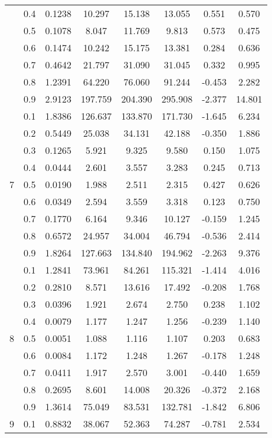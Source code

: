 \documentclass[11pt,a4paper]{report}
\begin{document}
\begin{longtable}{ | c | c || c | c | c | c | c | c | }
 & 0.4 & 0.1238 & 10.297 & 15.138 & 13.055 & 0.551 & 0.570 \\
 & 0.5 & 0.1078 & 8.047 & 11.769 & 9.813 & 0.573 & 0.475 \\
 & 0.6 & 0.1474 & 10.242 & 15.175 & 13.381 & 0.284 & 0.636 \\
 & 0.7 & 0.4642 & 21.797 & 31.090 & 31.045 & 0.332 & 0.995 \\
 & 0.8 & 1.2391 & 64.220 & 76.060 & 91.244 & -0.453 & 2.282 \\
 & 0.9 & 2.9123 & 197.759 & 204.390 & 295.908 & -2.377 & 14.801 \\
 \hline
\multirow{9}{*}{7} & 0.1 & 1.8386 & 126.637 & 133.870 & 171.730 & -1.645 & 6.234 \\
 & 0.2 & 0.5449 & 25.038 & 34.131 & 42.188 & -0.350 & 1.886 \\
 & 0.3 & 0.1265 & 5.921 & 9.325 & 9.580 & 0.150 & 1.075 \\
 & 0.4 & 0.0444 & 2.601 & 3.557 & 3.283 & 0.245 & 0.713 \\
 & 0.5 & 0.0190 & 1.988 & 2.511 & 2.315 & 0.427 & 0.626 \\
 & 0.6 & 0.0349 & 2.594 & 3.559 & 3.318 & 0.123 & 0.750 \\
 & 0.7 & 0.1770 & 6.164 & 9.346 & 10.127 & -0.159 & 1.245 \\
 & 0.8 & 0.6572 & 24.957 & 34.004 & 46.794 & -0.536 & 2.414 \\
 & 0.9 & 1.8264 & 127.663 & 134.840 & 194.962 & -2.263 & 9.376 \\
 \hline
\multirow{9}{*}{8} & 0.1 & 1.2841 & 73.961 & 84.261 & 115.321 & -1.414 & 4.016 \\
 & 0.2 & 0.2810 & 8.571 & 13.616 & 17.492 & -0.208 & 1.768 \\
 & 0.3 & 0.0396 & 1.921 & 2.674 & 2.750 & 0.238 & 1.102 \\
 & 0.4 & 0.0079 & 1.177 & 1.247 & 1.256 & -0.239 & 1.140 \\
 & 0.5 & 0.0051 & 1.088 & 1.116 & 1.107 & 0.203 & 0.683 \\
 & 0.6 & 0.0084 & 1.172 & 1.248 & 1.267 & -0.178 & 1.248 \\
 & 0.7 & 0.0411 & 1.917 & 2.570 & 3.001 & -0.440 & 1.659 \\
 & 0.8 & 0.2695 & 8.601 & 14.008 & 20.326 & -0.372 & 2.168 \\
 & 0.9 & 1.3614 & 75.049 & 83.531 & 132.781 & -1.842 & 6.806 \\
 \hline
\multirow{9}{*}{9} & 0.1 & 0.8832 & 38.067 & 52.363 & 74.287 & -0.781 & 2.534 \\

\end{longtable}
\end{document}
